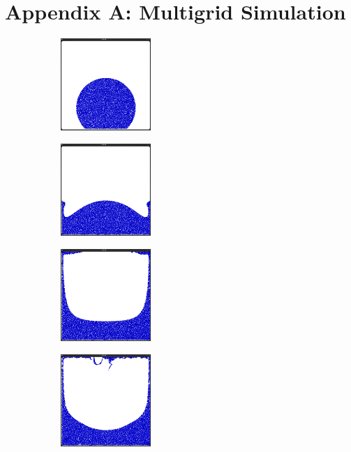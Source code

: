 \section*{Appendix A: Multigrid Simulation}
\begin{figure}[ht!]
\centering
\begin{subfigure}[]{}
\includegraphics[height=35mm]{png/multigrid0.png}
\end{subfigure}
\begin{subfigure}[]{}
\includegraphics[height=35mm]{png/multigrid1.png}
\end{subfigure}
\begin{subfigure}[]{}
\includegraphics[height=35mm]{png/multigrid2.png}
\end{subfigure}
\begin{subfigure}[]{}
\includegraphics[height=35mm]{png/multigrid3.png}
\end{subfigure}
\begin{subfigure}[]{}

\end{subfigure}
\end{figure}
